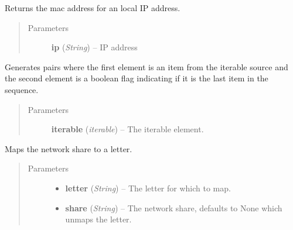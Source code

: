 \documentclass[letterpaper,10pt,english]{sphinxmanual}
\begin{document}

\begin{fulllineitems}
\label{utils:utils.GetMacForIp}
Returns the mac address for an local IP address.
\begin{quote}\begin{description}
\item[{Parameters}] \leavevmode
\textbf{ip} (\emph{String}) -- IP address

\end{description}\end{quote}

\end{fulllineitems}


\begin{fulllineitems}
\label{utils:utils.IterIsLast}
Generates pairs where the first element is an item from the iterable
source and the second element is a boolean flag indicating if it is the
last item in the sequence.
\begin{quote}\begin{description}
\item[{Parameters}] \leavevmode
\textbf{iterable} (\emph{iterable}) -- The iterable element.

\end{description}\end{quote}

\end{fulllineitems}


\begin{fulllineitems}
\label{utils:utils.MapNetworkShare}
Maps the network share to a letter.
\begin{quote}\begin{description}
\item[{Parameters}] \leavevmode\begin{itemize}
\item {} 
\textbf{letter} (\emph{String}) -- The letter for which to map.

\item {} 
\textbf{share} (\emph{String}) -- The network share, defaults to None which unmaps the letter.

\end{itemize}

\end{description}\end{quote}

\end{fulllineitems}
\end{document}
